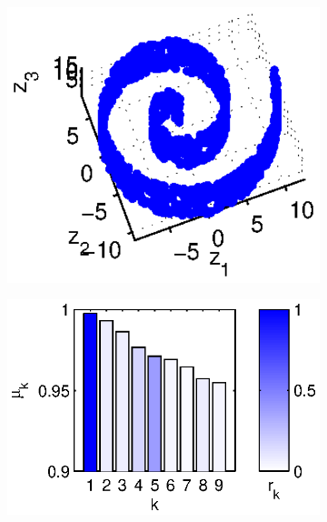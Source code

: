 \documentclass[3p]{elsarticle}
\begin{document}
\begin{figure}[!t]
\begin{subfigure}{0.2\textwidth}
\centering
\includegraphics[width=\textwidth]{swissroll2}
\caption{}
\label{subfig:swissroll2}
\end{subfigure}%
%
\begin{subfigure}{0.25\textwidth}
\centering
\includegraphics[width=\textwidth]{swissroll2_evals}
\caption{}
\label{subfig:swissroll2_evals}
\end{subfigure}
%
\begin{subfigure}{0.25\textwidth}
\centering

\end{subfigure}
\end{figure}
\end{document}
